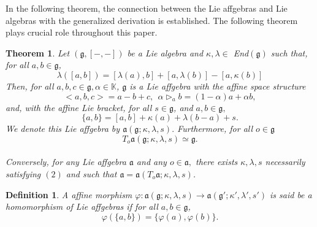 \documentclass{article}
\newtheorem{definition}{Definition}[section]
\newtheorem{theorem}{Theorem}[section]
\theoremstyle{definition}
\theoremstyle{remark}
\theoremstyle{plain}
\begin{document}
In the following theorem, the connection between the Lie affgebras and Lie algebras with the generalized derivation is established. The following theorem plays crucial role throughout this paper. 
\begin{theorem}\cite{And2}
    Let $(\mathfrak{g}, [-, -])$ be a Lie algebra and $\kappa, \lambda \in$ End$(\mathfrak{g})$ such that, for all $a, b \in \mathfrak{g}$, 
\begin{equation}\label{eq}
    \lambda([a, b])= [\lambda(a), b]+[a, \lambda(b)]-[a, \kappa(b)]
\end{equation}
Then, for all $a, b , c \in \mathfrak{g}, \alpha \in \mathbb{K}$,  $\mathfrak{g}$ is a Lie affgebra with the affine space structure 
\begin{equation}
    <a, b, c>=a-b+c, ~~\alpha\triangleright_{a}b=(1-\alpha)a+\alpha b,
\end{equation} 
and, with the affine Lie bracket, for all $s\in \mathfrak{g}$, and $a, b \in \mathfrak{g},$ 
\begin{equation}
    \{a, b\}=[a, b]+\kappa(a)+\lambda(b-a)+s.
\end{equation}
 We denote this Lie affgebra by $\mathfrak{a}(\mathfrak{g}; \kappa, \lambda, s).$ Furthermore, for all $o \in \mathfrak{g}$\\
 $$T_{o}\mathfrak{a}(\mathfrak{g}; \kappa, \lambda, s)\simeq \mathfrak{g}.$$\\
 Conversely, for any Lie affgebra $\mathfrak{a}$ and any $o\in \mathfrak{a},$ there exists $\kappa, \lambda, s$ necessarily satisfying $(2)$ and such that $\mathfrak{a}=\mathfrak{a}(T_{o}\mathfrak{a}; \kappa, \lambda, s)$.
\end{theorem}
\begin{definition}
    A affine morphism $\varphi:\mathfrak{a}(\mathfrak{g}; \kappa,\lambda,s)\to \mathfrak{a}(\mathfrak{g'}; \kappa',\lambda',s')$ is said be a homomorphism of Lie affgebras if for all $a,b\in \mathfrak{g}$,
    $$
    \varphi\left(\{a,b\}\right) = \{\varphi(a),\varphi(b)\}.
    $$
\end{definition}
\end{document}
